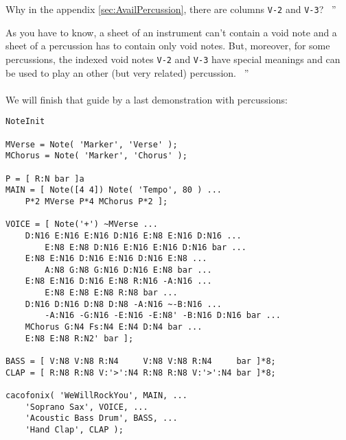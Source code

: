 \documentclass{article}
\newenvironment{meenv}{ \par \noindent \makebox[6em][r]{ \textcolor{mecolor}{Me}: `` --~}}{~''}
\newenvironment{myselfenv}{ \par \noindent \makebox[6em][r]{ \textcolor{myselfcolor}{Myself}: `` --~}}{~''}
\begin{document}
\begin{meenv}%
	Why in the appendix \ref{sec:AvailPercussion}, there are columns \lstinline!V-2! and \lstinline!V-3!?%
\end{meenv}
\begin{myselfenv}%
	As you have to know, a sheet of an instrument can't contain a void note and a sheet of a percussion has to contain only void notes. But, moreover, for some percussions, the indexed void notes \lstinline!V-2! and \lstinline!V-3! have special meanings and can be used to play an other (but very related) percussion.%
\end{myselfenv}

\paragraph{}

We will finish that guide by a last demonstration with percussions:


\begin{lstlisting}
NoteInit

MVerse = Note( 'Marker', 'Verse' );
MChorus = Note( 'Marker', 'Chorus' );

P = [ R:N bar ]a
MAIN = [ Note([4 4]) Note( 'Tempo', 80 ) ...
	P*2 MVerse P*4 MChorus P*2 ];

VOICE = [ Note('+') ~MVerse ...
	D:N16 E:N16 E:N16 D:N16 E:N8 E:N16 D:N16 ...
		E:N8 E:N8 D:N16 E:N16 E:N16 D:N16 bar ...
	E:N8 E:N16 D:N16 E:N16 D:N16 E:N8 ...
		A:N8 G:N8 G:N16 D:N16 E:N8 bar ...
	E:N8 E:N16 D:N16 E:N8 R:N16 -A:N16 ...
		E:N8 E:N8 E:N8 R:N8 bar ...
	D:N16 D:N16 D:N8 D:N8 -A:N16 ~-B:N16 ...
		-A:N16 -G:N16 -E:N16 -E:N8' -B:N16 D:N16 bar ...
	MChorus G:N4 Fs:N4 E:N4 D:N4 bar ...
	E:N8 E:N8 R:N2' bar ];

BASS = [ V:N8 V:N8 R:N4     V:N8 V:N8 R:N4     bar ]*8;
CLAP = [ R:N8 R:N8 V:'>':N4 R:N8 R:N8 V:'>':N4 bar ]*8;

cacofonix( 'WeWillRockYou', MAIN, ...
	'Soprano Sax', VOICE, ...
	'Acoustic Bass Drum', BASS, ...
	'Hand Clap', CLAP );
\end{lstlisting}
\end{document}
